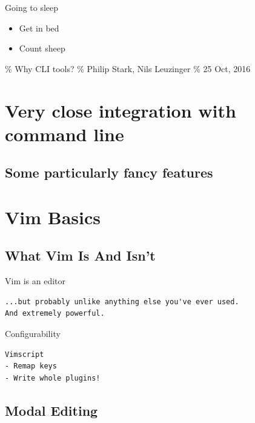 \documentclass[aspectratio=169,12pt]{beamer}
\providecommand{\tightlist}{%
  \setlength{\itemsep}{0pt}\setlength{\parskip}{0pt}}
\begin{document}
\begin{frame}{Going to sleep}

\begin{itemize}
\tightlist
\item
  Get in bed
\item
  Count sheep
\end{itemize}

\% Why CLI tools? \% Philip Stark, Nils Leuzinger \% 25 Oct, 2016

\end{frame}

\section{Very close integration with command line}

\subsection{Some particularly fancy features}

\section{Vim Basics}

\subsection{What Vim Is And Isn't}

\begin{frame}[fragile]{Vim is an editor}

\begin{verbatim}
...but probably unlike anything else you've ever used. 
And extremely powerful.
\end{verbatim}

\end{frame}

\begin{frame}[fragile]{Configurability}

\begin{verbatim}
Vimscript
- Remap keys
- Write whole plugins!
\end{verbatim}

\end{frame}

\subsection{Modal Editing}
\end{document}
